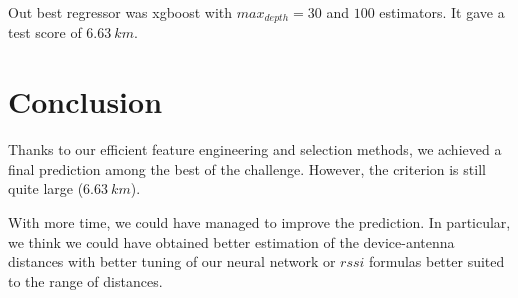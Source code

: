 \documentclass[twocolumn,2pt]{article}
\begin{document}
	Out best regressor was xgboost with $max_{depth} = 30$ and $100$ estimators. It gave a test score of $6.63 \ km$.
	
	\section{Conclusion}
	\label{conclusion}
	Thanks to our efficient feature engineering and selection methods, we achieved a final prediction among the best of the challenge. However, the criterion is still quite large ($6.63 \ km$). 
	
	With more time, we could have managed to improve the prediction. In particular, we think we could have obtained better estimation of the device-antenna distances with better tuning of our neural network or $rssi$ formulas better suited to the range of distances.
	
	
	
	
	
\end{document}
